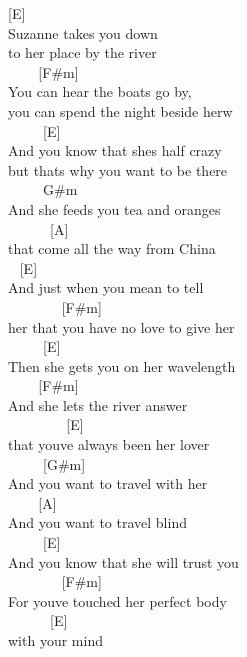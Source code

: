 \documentclass[
  letterpaper,
  twoside=false]{scrbook}
\begin{document}
{[}E{]} ~ ~ ~ ~ ~ ~ ~\\
Suzanne takes you down\\
to her place by the river\\
\hspace*{0.333em} ~ ~ ~{[}F\#m{]} ~ ~ ~ ~ ~\\
You can hear the boats go by,\\
you can spend the night beside herw\\
\hspace*{0.333em} ~ ~ ~ {[}E{]} ~ ~ ~ ~ ~ ~ ~ ~ ~\\
And you know that she\textquotesingle s half crazy\\
but that\textquotesingle s why you want to be there\\
\hspace*{0.333em} ~ ~ ~ G\#m ~ ~ ~ ~ ~ ~\\
And she feeds you tea and oranges\\
\hspace*{0.333em} ~ ~ ~ ~{[}A{]} ~ ~ ~ ~ ~ ~ ~\\
that come all the way from China\\
\hspace*{0.333em} ~ {[}E{]}\\
And just when you mean to tell\\
\hspace*{0.333em} ~ ~ ~ ~ ~{[}F\#m{]}\\
her that you have no love to give her\\
\hspace*{0.333em} ~ ~ ~ {[}E{]}\\
Then she gets you on her wavelength\\
\hspace*{0.333em} ~ ~ ~{[}F\#m{]}\\
And she lets the river answer ~ ~ ~ ~ ~ ~ ~ ~ ~ ~ ~ ~\\
\hspace*{0.333em} ~ ~ ~ ~ ~ {[}E{]}\\
that you\textquotesingle ve always been her lover\\
\hspace*{0.333em} ~ ~ ~ {[}G\#m{]}\\
And you want to travel with her\\
\hspace*{0.333em} ~ ~ ~{[}A{]}\\
And you want to travel blind\\
\hspace*{0.333em} ~ ~ ~ {[}E{]}\\
And you know that she will trust you\\
\hspace*{0.333em} ~ ~ ~ ~ ~{[}F\#m{]} ~ ~ ~\\
For you\textquotesingle ve touched her perfect body ~ ~ ~ ~ ~ ~ ~ ~\\
\hspace*{0.333em} ~ ~ ~ ~{[}E{]}\\
with your mind
\end{document}

